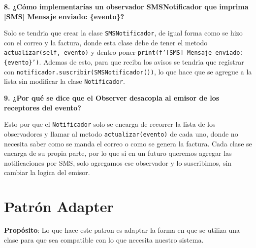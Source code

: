 \documentclass[letterpaper,11pt]{article}
\begin{document}
\textbf{8. ¿Cómo implementarías un observador SMSNotificador que imprima [SMS] Mensaje enviado: \{evento\}?}

Solo se tendria que crear la clase \texttt{SMSNotificador}, de igual forma como se hizo con el correo y la factura, donde esta clase debe de tener el metodo \texttt{actualizar(self, evento)} y dentro poner \texttt{print(f'[SMS] Mensaje enviado: \{evento\}')}. Ademas de esto, para que reciba los avisos se tendria que registrar con \texttt{notificador.suscribir(SMSNotificador())}, lo que hace que se agregue a la lista sin modificar la clase \texttt{Notificador}.

\textbf{9. ¿Por qué se dice que el Observer desacopla al emisor de los receptores del evento?}

Esto por que el \texttt{Notificador} solo se encarga de recorrer la lista de los observadores y llamar al metodo \texttt{actualizar(evento)} de cada uno, donde no necesita saber como se manda el correo o como se genera la factura. Cada clase se encarga de su propia parte, por lo que si en un futuro queremos agregar las notificaciones por SMS, solo agregamos ese observador y lo suscribimos, sin cambiar la logica del emisor.

\section{Patrón Adapter}



\textbf{Propósito}: Lo que hace este patron es adaptar la forma en que se utiliza una clase para que sea compatible con lo que necesita nuestro sistema.
\end{document}
